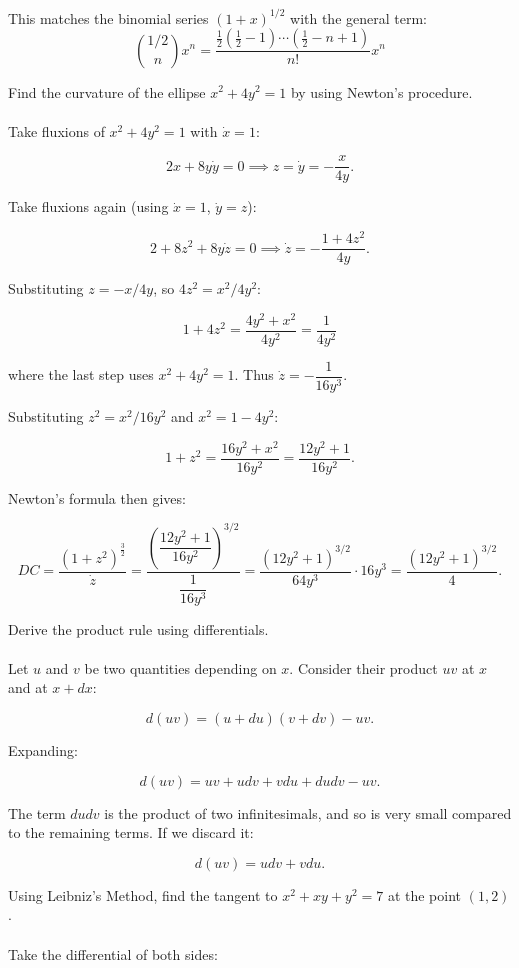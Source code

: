 \documentclass[12pt]{exam}
\begin{document}
\begin{questions}
This matches the binomial series $(1+x)^{1/2}$ with the general term:
$$\binom{1/2}{n} x^n = \frac{\tfrac{1}{2}\left(\tfrac{1}{2}-1\right)\cdots\left(\tfrac{1}{2}-n+1\right)}{n!}x^n$$

\newpage 
\question 
Find the curvature of the ellipse $x^2 + 4y^2 = 1$ by using
Newton's procedure.
\\\\
Take fluxions of $x^2 + 4y^2 = 1$ with $\dot{x} = 1$:

$$2x + 8y\dot{y} = 0 \implies z = \dot{y} = -\frac{x}{4y}.$$

Take fluxions again (using $\dot{x} = 1$, $\dot{y} = z$):

$$2 + 8z^2 + 8y\dot{z} = 0 \implies \dot{z} = -\frac{1 + 4z^2}{4y}.$$

Substituting $z = -x/4y$, so $4z^2 = x^2/4y^2$:

$$1 + 4z^2 = \frac{4y^2 + x^2}{4y^2} = \frac{1}{4y^2}$$

where the last step uses $x^2 + 4y^2 = 1$. Thus $\dot{z} = -\dfrac{1}{16y^3}$.

Substituting $z^2 = x^2/16y^2$ and $x^2 = 1 - 4y^2$:

$$1 + z^2 = \frac{16y^2 + x^2}{16y^2} = \frac{12y^2 + 1}{16y^2}.$$

Newton's formula then gives:

$$DC = \frac{(1+z^2)^\frac{3}{2}}{\dot{z}} = \frac{\left(\dfrac{12y^2+1}{16y^2}\right)^{3/2}}{\dfrac{1}{16y^3}} = \frac{(12y^2+1)^{3/2}}{64y^3} \cdot 16y^3 = \frac{(12y^2+1)^{3/2}}{4}.$$

\newpage 
\question 
Derive the product rule using differentials. 
\\\\
Let $u$ and $v$ be two quantities depending on $x$. Consider their product $uv$ at $x$ and at $x + dx$:

$$d(uv) = (u + du)(v + dv) - uv.$$

Expanding:

$$d(uv) = uv + udv + vdu + dudv - uv.$$

The term $dudv$ is the product of two infinitesimals, and so is very small compared to the remaining terms. If we discard it:

$$d(uv) = udv + vdu.$$

\newpage
\question 
Using Leibniz's Method, find the tangent to $x^2+xy+y^2=7$ at the 
point $(1,2)$.
\\\\
Take the differential of both sides:


\end{questions}
\end{document}
